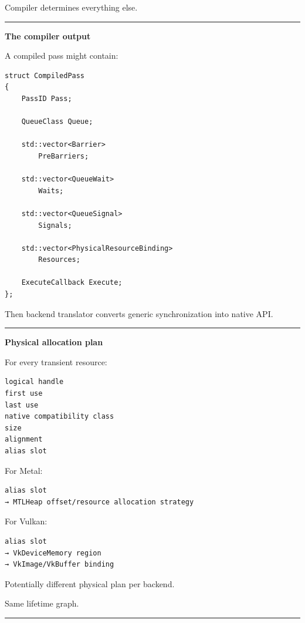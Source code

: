 Compiler determines everything else.

\begin{center}\rule{0.5\linewidth}{0.5pt}\end{center}

\textbf{The compiler output}

A compiled pass might contain:

\begin{verbatim}
struct CompiledPass
{
    PassID Pass;

    QueueClass Queue;

    std::vector<Barrier>
        PreBarriers;

    std::vector<QueueWait>
        Waits;

    std::vector<QueueSignal>
        Signals;

    std::vector<PhysicalResourceBinding>
        Resources;

    ExecuteCallback Execute;
};
\end{verbatim}

Then backend translator converts generic synchronization into native API.

\begin{center}\rule{0.5\linewidth}{0.5pt}\end{center}

\textbf{Physical allocation plan}

For every transient resource:

\begin{verbatim}
logical handle
first use
last use
native compatibility class
size
alignment
alias slot
\end{verbatim}

For Metal:

\begin{verbatim}
alias slot
→ MTLHeap offset/resource allocation strategy
\end{verbatim}

For Vulkan:

\begin{verbatim}
alias slot
→ VkDeviceMemory region
→ VkImage/VkBuffer binding
\end{verbatim}

Potentially different physical plan per backend.

Same lifetime graph.

\begin{center}\rule{0.5\linewidth}{0.5pt}\end{center}

